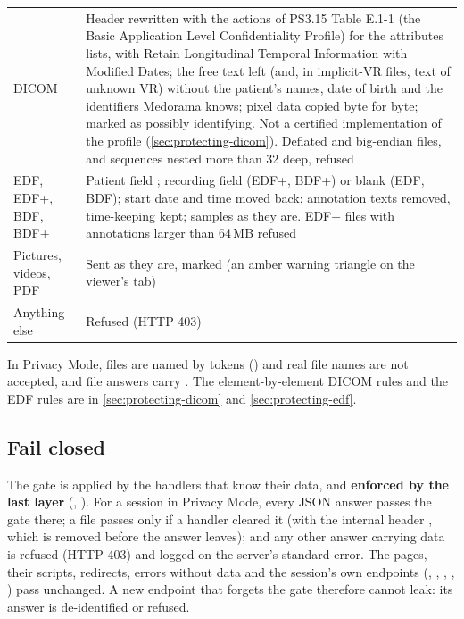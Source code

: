 \begin{xltabular}{\linewidth}{@{}P{3.0cm}L@{}}
DICOM & Header rewritten with the actions of PS3.15 Table E.1-1 (the Basic Application Level
  Confidentiality Profile) for the attributes  lists, with Retain Longitudinal
  Temporal Information with Modified Dates; the free text left (and, in implicit-VR files, text
  of unknown VR) without the patient's names, date of birth and the identifiers Medorama knows; pixel
  data copied byte for byte; marked as possibly identifying. Not a certified implementation of
  the profile (\cref{sec:protecting-dicom}). Deflated and big-endian files, and sequences nested
  more than 32 deep, refused \\
EDF, EDF+, BDF, BDF+ & Patient field ; recording field  (EDF+, BDF+) or blank (EDF, BDF); start date and time moved back; annotation texts
  removed, time-keeping kept; samples as they are. EDF+ files with annotations larger than
  64\,MB refused \\
Pictures, videos, PDF & Sent as they are, marked  (an amber
  warning triangle on the viewer's tab) \\
Anything else & Refused (HTTP 403) \\
\end{xltabular}

In Privacy Mode, files are named by tokens () and real file names are not
accepted, and file answers carry . The element-by-element DICOM rules and the
EDF rules are in \cref{sec:protecting-dicom} and \cref{sec:protecting-edf}.

\subsection{Fail closed}
\label{sec:security-fail-closed}

The gate is applied by the handlers that know their data, and \textbf{enforced by the last layer}
(, ). For a session in Privacy Mode, every JSON answer passes the
gate there; a file passes only if a handler cleared it (with the internal header
, which is removed before the answer leaves); and any other answer carrying
data is refused (HTTP 403) and logged on the server's standard error. The pages, their scripts,
redirects, errors without data and the session's own endpoints (, ,
, , ) pass unchanged. A new endpoint that forgets the
gate therefore cannot leak: its answer is de-identified or refused.


